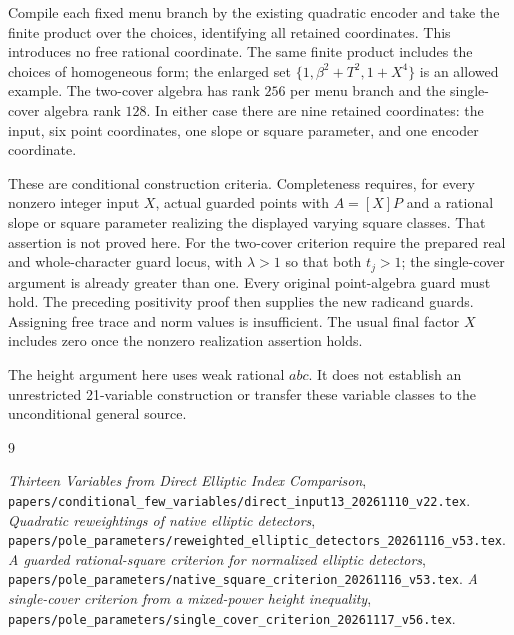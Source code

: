\documentclass[11pt,a4paper]{article}
\begin{document}
Compile each fixed menu branch by the existing quadratic encoder
and take the finite product over the choices, identifying all
retained coordinates. This introduces no free rational coordinate.
The same finite product includes the choices of homogeneous form;
the enlarged set $\{1,\beta^2+T^2,1+X^4\}$ is an allowed example.
The two-cover algebra has rank $256$ per menu branch and the
single-cover algebra rank $128$. In either case there are nine
retained coordinates: the input, six point coordinates, one slope
or square parameter, and one encoder coordinate.

These are conditional construction criteria. Completeness requires,
for every nonzero integer input $X$, actual guarded points with
$A=[X]P$ and a rational slope or square parameter realizing the
displayed varying square classes. That assertion is not proved here.
For the two-cover criterion require the prepared real and
whole-character guard locus, with $\lambda>1$ so that both $t_j>1$;
the single-cover argument is already greater than one. Every original
point-algebra guard must hold. The preceding positivity proof then
supplies the new radicand guards. Assigning free trace and norm values
is insufficient. The usual final factor $X$
includes zero once the nonzero realization assertion holds.

The height argument here uses weak rational $abc$. It does not
establish an unrestricted 21-variable construction or transfer these
variable classes to the unconditional general source.

\begin{thebibliography}{9}\raggedright
{}\emph{Thirteen Variables from Direct Elliptic Index
Comparison}, \nolinkurl{papers/conditional_few_variables/direct_input13_20261110_v22.tex}.
\emph{Quadratic reweightings of native elliptic detectors},
\nolinkurl{papers/pole_parameters/reweighted_elliptic_detectors_20261116_v53.tex}.
\emph{A guarded rational-square criterion for normalized elliptic detectors},
\nolinkurl{papers/pole_parameters/native_square_criterion_20261116_v53.tex}.
\emph{A single-cover criterion from a mixed-power height inequality},
\nolinkurl{papers/pole_parameters/single_cover_criterion_20261117_v56.tex}.
\end{thebibliography}
\end{document}
